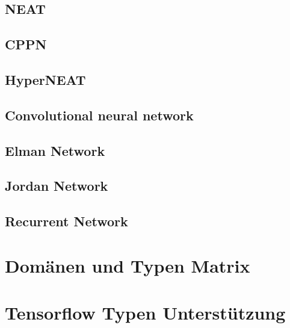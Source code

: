 \subsection{NEAT}

\subsection{CPPN}

\subsection{HyperNEAT}

\subsection{Convolutional neural network}

\subsection{Elman Network}

\subsection{Jordan Network}

\subsection{Recurrent Network}

\section{Domänen und Typen Matrix}

\section{Tensorflow Typen Unterstützung}
